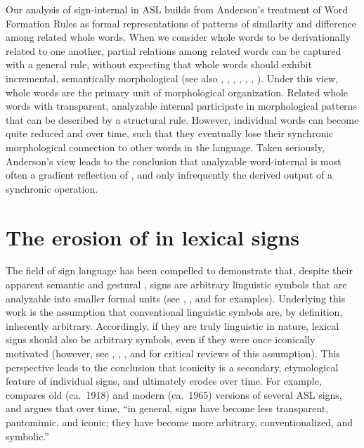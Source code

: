 \documentclass[output=paper,
modfonts
]{LSP/langsci}
\begin{document}
  Our analysis of sign-internal  in ASL builds from Anderson's treatment of Word Formation Rules as formal representations of patterns of similarity and difference among related whole words. When we consider whole words to be derivationally related to one another, partial relations among related words can be captured with a general rule, without expecting that whole words should exhibit incremental, semantically  morphological  (see also \citealt{ackerman2016}, \citealt{Aronoff1976}, \citealt{Bochner1993},  \citealt{Hay2005}, \citealt{Aronoff2007}, \citealt{Blevins2016}, \citealt{Andersoninpress}). Under this view, whole words are the primary unit of morphological organization. Related whole words with transparent, analyzable internal  participate in morphological patterns that can be described by a structural rule. However, individual words can become quite reduced and  over time, such that they eventually lose their synchronic morphological connection to other words in the language. Taken seriously, Anderson's view leads to the conclusion that analyzable word-internal  is most often a gradient reflection of , and only infrequently the derived output of a synchronic operation.

\section{The erosion of  in lexical signs}\label{sec:2}

The field of sign language  has been compelled to demonstrate that, despite their apparent semantic and gestural , signs are arbitrary linguistic symbols that are analyzable into smaller formal units (see \citealt{Stokoe1960},  \citealt{Klima1979}, and \citealt{Supalla1986} for examples). Underlying this work is the assumption that conventional linguistic symbols are, by definition, inherently arbitrary. Accordingly, if they are truly linguistic in nature, lexical signs should also be arbitrary symbols, even if they were once iconically motivated (however, see \citealt{Wilcox1995}, \citealt{Taub2001}, \citealt{Perniss2010}, and \citealt{Emmorey2014} for critical reviews of this assumption). This perspective leads to the conclusion that iconicity is a secondary, etymological feature of individual signs, and ultimately erodes over time. For example, \citet[718]{Frishberg1975} compares old (ca.\ 1918) and modern (ca.\ 1965) versions of several ASL signs, and argues that over time, ``in general, signs have become less transparent, pantomimic, and iconic; they have become more arbitrary, conventionalized, and symbolic.''
\end{document}
